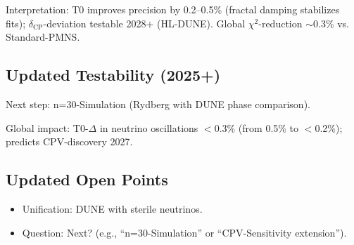 	\begin{table}[ht]
		\centering
	\end{table}
	
	Interpretation: T0 improves precision by 0.2–0.5\% (fractal damping stabilizes fits); $\delta_\text{CP}$-deviation testable 2028+ (HL-DUNE). Global $\chi^2$-reduction $\sim$0.3\% vs. Standard-PMNS.
	
	\subsection{Updated Testability (2025+)}
	
	Next step: n=30-Simulation (Rydberg with DUNE phase comparison).
	
	Global impact: T0-$\Delta$ in neutrino oscillations $<$0.3\% (from 0.5\% to $<$0.2\%); predicts CPV-discovery 2027.
	
	\subsection{Updated Open Points}
	
	\begin{itemize}
		\item Unification: DUNE with sterile neutrinos.
		\item Question: Next? (e.g., ``n=30-Simulation'' or ``CPV-Sensitivity extension'').
	\end{itemize}
	
